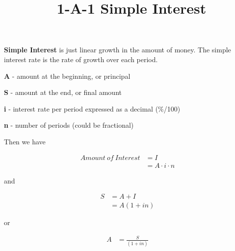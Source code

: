 \documentclass[12pt]{article}
\title{\normalfont\ 1-A-1 Simple Interest} %
\author{} %
\date{}  %
\begin{document}
\maketitle %

\vspace{-1in}

\begin{flushleft}
    \textbf{Simple Interest} is just linear growth in the amount of money.
    The simple interest rate is the rate of growth over each period.
\end{flushleft}

\begin{description}
    \item\textbf{A} - amount at the beginning, or principal
    \item\textbf{S} - amount at the end, or final amount
    \item\textbf{i} - interest rate per period expressed as a decimal {(\%/100)}
    \item\textbf{n} - number of periods (could be fractional)
\end{description}

\begin{flushleft}
    Then we have
\end{flushleft}

\vspace{-.5in}

\begin{align*}
    Amount \: of \: Interest & = I                 \\
                             & = A \cdot i \cdot n
\end{align*}

\begin{flushleft}
    and
\end{flushleft}
\vspace{-.5in}

\begin{align*}
    S & = A + I     \\
      & = A(1 + in)
\end{align*}

\begin{flushleft}
    or
\end{flushleft}

\begin{align*}
    A & = \frac{S}{(1+in)}
\end{align*}
\vspace{.25in}
\end{document}
